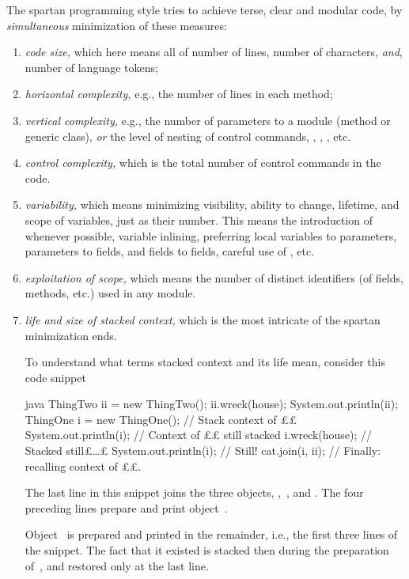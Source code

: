 The spartan programming style tries to achieve terse, clear and modular code,
by \textit{simultaneous} minimization of these measures:
\begin{enumerate}
  \item \textit{code size,} which here means all of number of lines, number of
        characters, \emph{and}, number of language tokens;
  \item \textit{horizontal complexity,} e.g., the number of lines in each
        method;
  \item \textit{vertical complexity,} e.g., the number of parameters to a
        module (method or generic class), \emph{or} the level of nesting of
        control commands, , , , etc.
  \item \textit{control complexity,} which is the total number of control
        commands in the code.
  \item \textit{variability,} which means minimizing visibility, ability to
        change, lifetime, and scope of variables, just as their number.
        This means the introduction of  whenever possible,
        variable inlining, preferring local variables to parameters, parameters
        to fields, and fields to  fields, careful use of
        , etc.
  \item \textit{exploitation of scope,} which means the number of distinct
        identifiers (of fields, methods, etc.) used in any module.
  \item \textit{life and size of stacked context,} which is the most intricate of the
        spartan minimization ends.

        To understand what terms stacked context and its life mean, consider
        this code snippet

        \begin{code}[minipage,width=54ex]{java}
ThingTwo ii = new ThingTwo();
ii.wreck(house);
System.out.println(ii);
ThingOne i = new ThingOne(); // Stack context of ££
System.out.println(i); // Context of ££ still stacked
i.wreck(house); // Stacked still£…£
System.out.println(i); // Still!
cat.join(i, ii); // Finally: recalling context of ££.
  \end{code}
  The last line in this snippet joins the three objects,
  ,~, and . The four preceding lines prepare
  and print object~.

  Object~ is prepared and printed in the remainder, i.e., the first three
  lines of the snippet. The fact that it existed is stacked then during the
  preparation of~, and restored only at the last line.


\end{enumerate}
